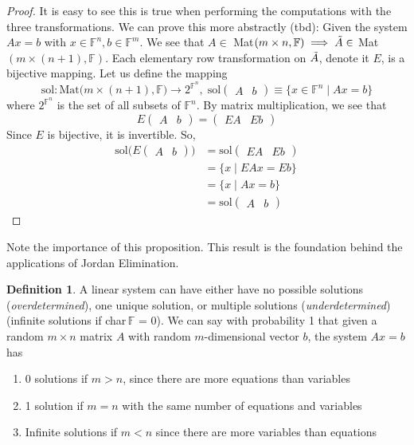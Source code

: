\documentclass{article}
\theoremstyle{remark}
\theoremstyle{definition}
\newtheorem{definition}{Definition}[section]
\begin{document}
\begin{proof}
It is easy to see this is true when performing the computations with the three transformations. We can prove this more abstractly (tbd): Given the system $A x = b$ with $x \in \mathbb{F}^n, b \in \mathbb{F}^m$. We see that $A \in $ Mat$(m \times n, \mathbb{F}) \implies \Tilde{A} \in$ Mat$(m \times (n+1), \mathbb{F})$. Each elementary row transformation on $\Tilde{A}$, denote it $E$, is a bijective mapping. Let us define the mapping 
\[\text{sol}: \text{Mat}\big( m \times (n+1), \mathbb{F} \big) \longrightarrow 2^{\mathbb{F}^n}, \; \text{sol} \begin{pmatrix}
A & b
\end{pmatrix} \equiv \{ x\in \mathbb{F}^n \; | \; A x = b\} \]
where $2^{\mathbb{F}^n}$ is the set of all subsets of $\mathbb{F}^n$. By matrix multiplication, we see that 
\[ E \begin{pmatrix}
A & b
\end{pmatrix} = \begin{pmatrix}
E A & E b
\end{pmatrix}\]
Since $E$ is bijective, it is invertible. So, 
\begin{align*} 
\text{sol} \big( E \begin{pmatrix}
A & b \end{pmatrix} \big) & = \text{sol} \begin{pmatrix}
E A & E b \end{pmatrix} \\ 
& = \{ x \; | \; E A x = E b\} \\ 
& = \{ x \; | \; A x = b\} \\ 
& = \text{sol} \begin{pmatrix} A & b \end{pmatrix}
\end{align*}
\end{proof}

Note the importance of this proposition. This result is the foundation behind the applications of Jordan Elimination.

\begin{definition}
A linear system can have either have no possible solutions (\textit{overdetermined}), one unique solution, or multiple solutions (\textit{underdetermined}) (infinite solutions if char$\, \mathbb{F}$ = 0). We can say with probability 1 that given a random $m \times n$ matrix $A$ with random $m$-dimensional vector $b$, the system $A x = b$ has
\begin{enumerate}
    \item 0 solutions if $m > n$, since there are more equations than variables
    \item 1 solution if $m = n$ with the same number of equations and variables
    \item Infinite solutions if $m < n$ since there are more variables than equations
\end{enumerate}
\end{definition}
\end{document}
